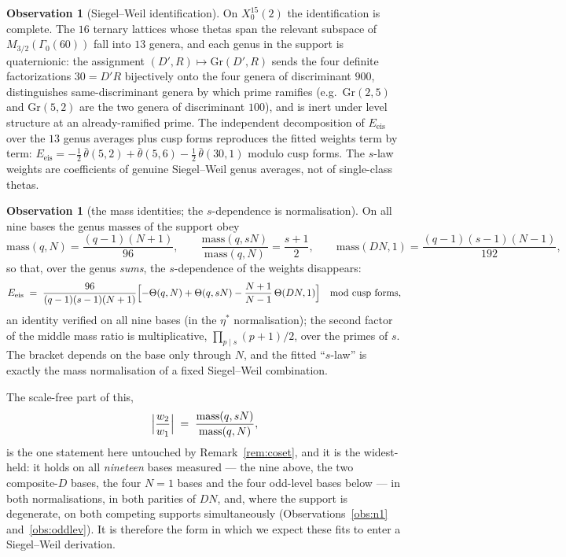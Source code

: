 \documentclass[11pt,reqno]{amsart}
\theoremstyle{plain}
\theoremstyle{definition}
\newtheorem{observation}[theorem]{Observation}
\begin{document}
\begin{observation}[Siegel--Weil identification]\label{obs:sw}
On $X_0^{15}(2)$ the identification is complete. The $16$ ternary lattices whose thetas
span the relevant subspace of $M_{3/2}(\Gamma_0(60))$ fall into $13$ genera, and each
genus in the support is quaternionic: the assignment $(D',R)\mapsto\mathrm{Gr}(D',R)$
sends the four definite factorizations $30=D'R$ bijectively onto the four genera of
discriminant $900$, distinguishes same-discriminant genera by which prime ramifies
(e.g.\ $\mathrm{Gr}(2,5)$ and $\mathrm{Gr}(5,2)$ are the two genera of discriminant
$100$), and is inert under level structure at an already-ramified prime. The independent
decomposition of $E_{\mathrm{eis}}$ over the $13$ genus averages plus cusp forms
reproduces the fitted weights term by term:
$E_{\mathrm{eis}}=-\tfrac12\,\bar\theta(5,2)+\bar\theta(5,6)-\tfrac12\,\bar\theta(30,1)$
modulo cusp forms. The $s$-law weights are coefficients of genuine Siegel--Weil genus
averages, not of single-class thetas.
\end{observation}

\begin{observation}[the mass identities; the $s$-dependence is normalisation]\label{obs:mass}
On all nine bases the genus masses of the support obey
\[
  \mathrm{mass}(q,N)=\frac{(q-1)(N+1)}{96},\qquad
  \frac{\mathrm{mass}(q,sN)}{\mathrm{mass}(q,N)}=\frac{s+1}{2},\qquad
  \mathrm{mass}(DN,1)=\frac{(q-1)(s-1)(N-1)}{192},
\]
so that, over the genus \emph{sums}, the $s$-dependence of the weights disappears:
\[
  E_{\mathrm{eis}}\;=\;\frac{96}{(q-1)(s-1)(N+1)}
  \Bigl[-\Theta(q,N)+\Theta(q,sN)-\frac{N+1}{N-1}\,\Theta(DN,1)\Bigr]
  \quad\text{mod cusp forms},
\]
an identity verified on all nine bases (in the $\eta^*$ normalisation); the second factor
of the middle mass ratio is multiplicative, $\prod_{p\mid s}(p+1)/2$, over the primes of
$s$. The bracket depends on the base only through $N$, and the fitted ``$s$-law'' is
exactly the mass normalisation of a fixed Siegel--Weil combination.

The scale-free part of this,
\[
  \Bigl\lvert\frac{w_2}{w_1}\Bigr\rvert\;=\;
  \frac{\mathrm{mass}(q,sN)}{\mathrm{mass}(q,N)},
\]
is the one statement here untouched by Remark~\ref{rem:coset}, and it is the widest-held:
it holds on all \emph{nineteen} bases measured --- the nine above, the two composite-$D$
bases, the four $N=1$ bases and the four odd-level bases below --- in both normalisations,
in both parities of $DN$, and, where the support is degenerate, on both competing supports
simultaneously (Observations~\ref{obs:n1} and~\ref{obs:oddlev}). It is
therefore the form in which we expect these fits to enter a Siegel--Weil derivation.
\end{observation}
\end{document}
